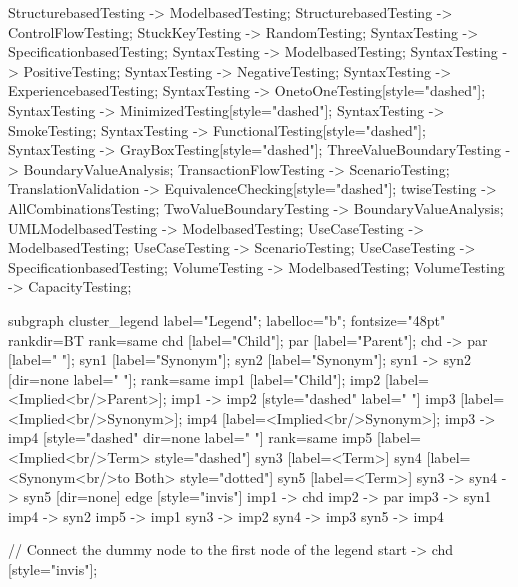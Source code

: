 \documentclass{article}
\begin{document}
{StructurebasedTesting -> ModelbasedTesting;
StructurebasedTesting -> ControlFlowTesting;
StuckKeyTesting -> RandomTesting;
SyntaxTesting -> SpecificationbasedTesting;
SyntaxTesting -> ModelbasedTesting;
SyntaxTesting -> PositiveTesting;
SyntaxTesting -> NegativeTesting;
SyntaxTesting -> ExperiencebasedTesting;
SyntaxTesting -> OnetoOneTesting[style="dashed"];
SyntaxTesting -> MinimizedTesting[style="dashed"];
SyntaxTesting -> SmokeTesting;
SyntaxTesting -> FunctionalTesting[style="dashed"];
SyntaxTesting -> GrayBoxTesting[style="dashed"];
ThreeValueBoundaryTesting -> BoundaryValueAnalysis;
TransactionFlowTesting -> ScenarioTesting;
TranslationValidation -> EquivalenceChecking[style="dashed"];
twiseTesting -> AllCombinationsTesting;
TwoValueBoundaryTesting -> BoundaryValueAnalysis;
UMLModelbasedTesting -> ModelbasedTesting;
UseCaseTesting -> ModelbasedTesting;
UseCaseTesting -> ScenarioTesting;
UseCaseTesting -> SpecificationbasedTesting;
VolumeTesting -> ModelbasedTesting;
VolumeTesting -> CapacityTesting;

subgraph cluster_legend {
    label="Legend";
    labelloc="b";
    fontsize="48pt"
    rankdir=BT
    {
        rank=same
        chd [label="Child"];
        par [label="Parent"];
        chd -> par [label="                "];
        syn1 [label="Synonym"];
        syn2 [label="Synonym"];
        syn1 -> syn2 [dir=none label="                "];
    }
    {
        rank=same
        imp1 [label="Child"];
        imp2 [label=<Implied<br/>Parent>];
        imp1 -> imp2 [style="dashed" label="                "]
        imp3 [label=<Implied<br/>Synonym>];
        imp4 [label=<Implied<br/>Synonym>];
        imp3 -> imp4 [style="dashed" dir=none label="                "]
    }
    {
        rank=same
        imp5 [label=<Implied<br/>Term> style="dashed"]
        syn3 [label=<Term>]
        syn4 [label=<Synonym<br/>to Both> style="dotted"]
        syn5 [label=<Term>]
        syn3 -> syn4 -> syn5 [dir=none]
    }
    edge [style="invis"]
    imp1 -> chd
    imp2 -> par
    imp3 -> syn1
    imp4 -> syn2
imp5 -> imp1
syn3 -> imp2
syn4 -> imp3
syn5 -> imp4
}

// Connect the dummy node to the first node of the legend
start -> chd [style="invis"];
}
\end{document}
